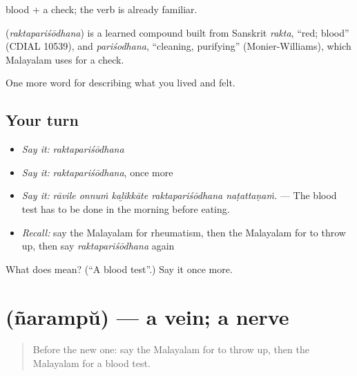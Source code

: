  blood +  a check; the verb  is already familiar.

\begin{cousinweb}
\textbf{} (\emph{raktapariśōdhana}) is a learned compound built from Sanskrit \emph{rakta}, \textquotedblleft{}red; blood\textquotedblright{} (CDIAL 10539), and \emph{pariśodhana}, \textquotedblleft{}cleaning, purifying\textquotedblright{} (Monier-Williams), which Malayalam uses for a check.
\end{cousinweb}

\begin{grammarlens}[title={What you've built}]
One more word for describing what you lived and felt.
\end{grammarlens}

\subsection*{Your turn}
\begin{itemize}
\raggedright
  \item \emph{Say it:} \emph{raktapariśōdhana}
  \item \emph{Say it:} \emph{raktapariśōdhana}, once more
  \item \emph{Say it:} \emph{rāvile onnuṁ kaḻikkāte raktapariśōdhana naṭattaṇaṁ.} — The blood test has to be done in the morning before eating.
  \item \emph{Recall:} say the Malayalam for rheumatism, then the Malayalam for to throw up, then say \emph{raktapariśōdhana} again
\end{itemize}

\begin{tcolorbox}[breakable,colback=teal!4,colframe=teal!35!black,title={Before you move on}]
What does  mean? (\textquotedblleft{}A blood test\textquotedblright{}.) Say it once more.
\end{tcolorbox}
\section[\texorpdfstring{\ml{ഞരമ്പ്} (ñarampŭ)}{ഞരമ്പ് (ñarampŭ)}]{ (ñarampŭ) — a vein; a nerve}

\label{lesson:ML-C536-narampu}



\begin{quote}
Before the new one: say the Malayalam for to throw up, then the Malayalam for a blood test.
\end{quote}

